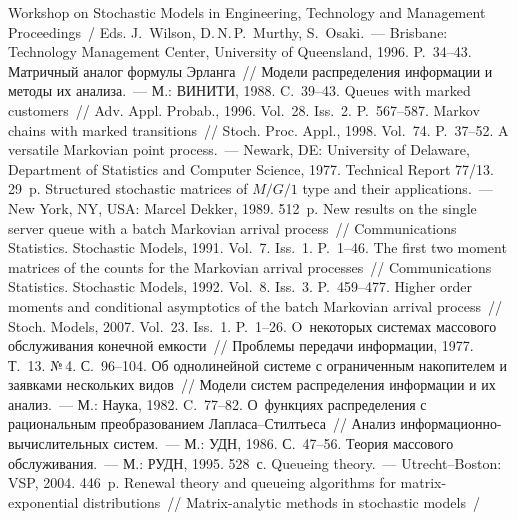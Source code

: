 \begin{multicols}{2}
{{\begin{thebibliography}{99}
Workshop on Stochastic Models in Engineering,
Technology 
and Management Proceedings~/ Eds. J.~Wilson, D.\,N.\,P.~Murthy, S.~Osaki.~--- 
Brisbane: Technology Management Center, University of Queensland, 1996. P.~34--43.
 Матричный аналог формулы Эрланга~// Модели распределения 
информации и методы их анализа.~--- М.: ВИНИТИ, 1988. C.~39--43.
 Queues with marked customers~// Adv. Appl. Probab., 1996. Vol.~28. 
Iss.~2. P.~567--587.
 Markov chains with marked transitions~// Stoch. Proc. 
Appl., 1998. Vol.~74. P.~37--52.
 A versatile Markovian point process.~--- Newark, DE: 
University of Delaware, Department of Statistics and Computer Science, 1977.
 Technical Report 77/13. 29~p.
 Structured stochastic matrices of $M/G/1$ type and their applications.~--- New 
York, NY, USA: Marcel Dekker, 1989. 512~p.
 New results on the single server queue with a batch Markovian arrival 
process~// Communications Statistics. Stochastic Models, 1991. Vol.~7. Iss.~1. P.~1--46. 
 The first two moment matrices of the counts for the Markovian 
arrival processes~// Communications Statistics. Stochastic Models, 1992. Vol.~8. Iss.~3. P.~459--477. 
 Higher order moments and 
conditional asymptotics of the batch Markovian arrival process~// Stoch. Models, 2007. Vol.~23. 
Iss.~1. P.~1--26.
 O~некоторых системах массового обслуживания 
конечной емкости~// Проб\-ле\-мы передачи информации, 1977. Т.~13. №\,4. С.~96--104.
 Об однолинейной системе с ограниченным накопителем и заявками 
нескольких видов~// Модели систем распределения информации и их анализ.~--- М.: 
Наука, 1982. C.~77--82.
 О~функциях распределения с рациональным преобразованием  
Лап\-ла\-са--Стилть\-еса~// Анализ информационно-вычислительных систем.~--- М.: 
УДН, 1986. С.~47--56.
 Теория массового обслуживания.~--- М.: РУДН, 
1995. 528~с.
 Queueing theory.~--- Utrecht--Boston: 
VSP, 2004. 446~p.
 Renewal theory and queueing algorithms for matrix-exponential 
distributions~// Matrix-analytic methods in stochastic models~/

\end{thebibliography}}}
\end{multicols}
